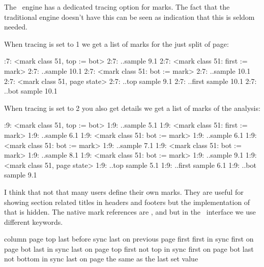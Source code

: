 \stopsectionlevel

\startsectionlevel[title=Tracing]

The \LUAMETATEX\ engine has a dedicated tracing option for marks. The fact that
the traditional engine doesn't have this can be seen as indication that this is
seldom needed.

\starttyping[option=TEX]
\stoptyping

When tracing is set to 1 we get a list of marks for the just split of page:

:7: <mark class 51, top := bot>
2:7: ..{sample 9.1}
2:7: <mark class 51: first := mark>
2:7: ..{sample 10.1}
2:7: <mark class 51: bot := mark>
2:7: ..{sample 10.1}
2:7: <mark class 51, page state>
2:7: ..top {sample 9.1}
2:7: ..first {sample 10.1}
2:7: ..bot {sample 10.1}
\stoptyping

When tracing is set to 2 you also get details we get a list of marks of the analysis:

:9: <mark class 51, top := bot>
1:9: ..{sample 5.1}
1:9: <mark class 51: first := mark>
1:9: ..{sample 6.1}
1:9: <mark class 51: bot := mark>
1:9: ..{sample 6.1}
1:9: <mark class 51: bot := mark>
1:9: ..{sample 7.1}
1:9: <mark class 51: bot := mark>
1:9: ..{sample 8.1}
1:9: <mark class 51: bot := mark>
1:9: ..{sample 9.1}
1:9: <mark class 51, page state>
1:9: ..top {sample 5.1}
1:9: ..first {sample 6.1}
1:9: ..bot {sample 9.1}
\stoptyping

\stopsectionlevel

\startsectionlevel[title=High level commands]

I think that not that many users define their own marks. They are useful for
showing section related titles in headers and footers but the implementation of
that is hidden. The native mark references are ,  and
 but in the \CONTEXT\ interface we use different keywords.

\starttabulate[|||||]
\FL
\BC \CONTEXT         \BC \TEX  \BC column                  \BC page                  \NC \NR
\ML
\NC {} \NC top   \NC last before sync        \NC last on previous page \NC \NR
\NC {}      \NC first \NC first in sync           \NC first on page         \NC \NR
\NC {}   \NC bot   \NC last in sync            \NC last on page          \NC \NR
\NC {}    \NC top   \NC first not top in sync   \NC first on page         \NC \NR
\NC {}     \NC bot   \NC last not bottom in sync \NC last on page          \NC \NR
\ML
\NC {}  \NS[2][c] the same as  \NC \NR
\NC {}  \NS[2][c] the last set value        \NC \NR
\LL
\stoptabulate

